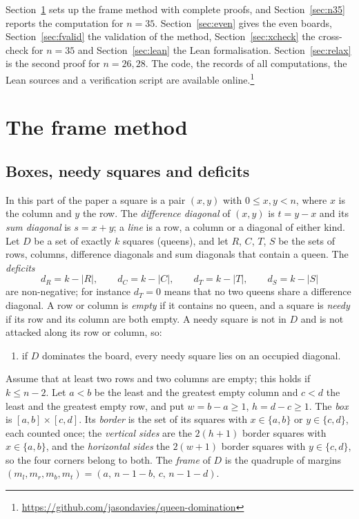 \documentclass[11pt]{article}
\theoremstyle{definition}
\theoremstyle{remark}
\newcommand{\repo}{\url{https://github.com/jasondavies/queen-domination}}
\newcommand{\dR}{d_R}
\newcommand{\dC}{d_C}
\newcommand{\dT}{d_T}
\newcommand{\dS}{d_S}
\begin{document}
Section~\ref{sec:frame} sets up the frame method with complete proofs, and Section~\ref{sec:n35}
reports the computation for $n=35$. Section~\ref{sec:even} gives the even boards,
Section~\ref{sec:fvalid} the validation of the method, Section~\ref{sec:xcheck} the cross-check for
$n=35$ and Section~\ref{sec:lean} the Lean formalisation. Section~\ref{sec:relax} is the second proof
for $n=26,28$. The code, the records of all computations, the Lean sources and a verification script are
available online.\footnote{\repo}

\section{The frame method}\label{sec:frame}

\subsection{Boxes, needy squares and deficits}

In this part of the paper a square is a pair $(x,y)$ with $0\le x,y<n$, where $x$ is the column and $y$
the row. The \emph{difference diagonal} of $(x,y)$ is $t=y-x$ and its \emph{sum diagonal} is $s=x+y$; a
\emph{line} is a row, a column or a diagonal of either kind. Let $D$ be a set of exactly $k$ squares
(queens), and let $R$, $C$, $T$, $S$ be the sets of rows, columns, difference diagonals and sum diagonals
that contain a queen. The \emph{deficits}
\[
  \dR=k-|R|,\qquad \dC=k-|C|,\qquad \dT=k-|T|,\qquad \dS=k-|S|
\]
are non-negative; for instance $\dT=0$ means that no two queens share a difference diagonal. A row or
column is \emph{empty} if it contains no queen, and a square is \emph{needy} if its row and its column are
both empty. A needy square is not in $D$ and is not attacked along its row or column, so:

\begin{enumerate}
\item[(N)] if $D$ dominates the board, every needy square lies on an occupied diagonal.
\end{enumerate}

Assume that at least two rows and two columns are empty; this holds if $k\le n-2$. Let $a<b$ be the
least and the greatest empty column and $c<d$ the least and the greatest empty row, and put $w=b-a\ge1$,
$h=d-c\ge1$. The \emph{box} is $[a,b]\times[c,d]$. Its \emph{border} is the set of its squares with
$x\in\{a,b\}$ or $y\in\{c,d\}$, each counted once; the \emph{vertical sides} are the $2(h+1)$ border
squares with $x\in\{a,b\}$, and the \emph{horizontal sides} the $2(w+1)$ border squares with
$y\in\{c,d\}$, so the four corners belong to both. The \emph{frame} of $D$ is the quadruple of margins
$(m_l,m_r,m_b,m_t)=(a,\,n-1-b,\,c,\,n-1-d)$.
\end{document}
